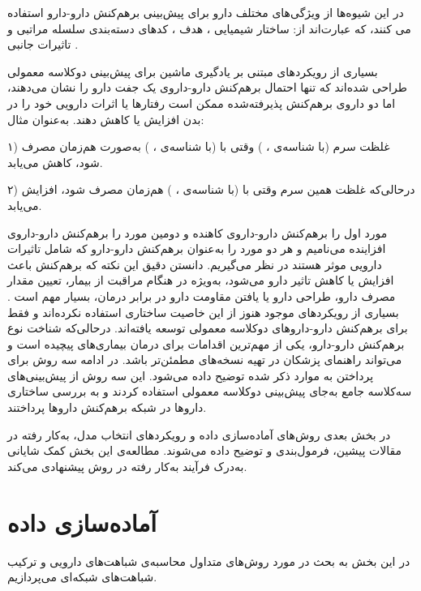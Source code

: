 در این شیوه‌ها از ویژگی‌های مختلف دارو برای پیش‌بینی برهم‌کنش دارو-دارو استفاده می کنند، که عبارت‌اند از: ساختار شیمیایی
\cite{Vilar2014}،
هدف
\cite{luo2014}،
کدهای دسته‌بندی سلسله مراتبی
\cite{Cheng2014}
و تاثیرات جانبی
\cite{Zhang2015, Shi2017}.

بسیاری از رویکردهای مبتنی بر یادگیری ماشین برای پیش‌بینی دوکلاسه معمولی طراحی شده‌اند که تنها احتمال برهم‌کنش دارو-داروی یک جفت دارو را نشان می‌دهند، اما دو داروی برهم‌کنش پذیرفته‌شده ممکن است رفتارها یا اثرات دارویی خود را در بدن افزایش یا کاهش دهند.
به‌عنوان مثال:

۱) غلظت سرم
(با شناسه‌ی
،
)
وقتی با
(با شناسه‌ی
،
)
به‌صورت هم‌زمان مصرف شود، کاهش می‌یابد.

۲) درحالی‌که غلظت همین سرم وقتی با 
(با شناسه‌ی
،
)
هم‌زمان مصرف شود، افزایش می‌یابد.

مورد اول را برهم‌کنش دارو-داروی کاهنده
و دومین مورد را برهم‌کنش دارو-داروی افزاینده
می‌نامیم و هر دو مورد را به‌عنوان برهم‌کنش دارو-دارو که شامل تاثیرات دارویی موثر هستند در نظر می‌گیریم. دانستن دقیق این نکته که برهم‌کنش باعث افزایش یا کاهش تاثیر دارو می‌شود، به‌ویژه در هنگام مراقبت از بیمار، تعیین مقدار مصرف دارو، طراحی دارو یا یافتن مقاومت دارو در برابر درمان، بسیار مهم است
\cite{Koch1981}.
بسیاری از رویکردهای موجود هنوز از این خاصیت ساختاری استفاده نکرده‌اند و فقط برای برهم‌کنش دارو-داروهای دوکلاسه معمولی توسعه یافته‌اند. درحالی‌که شناخت نوع برهم‌کنش دارو-دارو، یکی از مهم‌ترین اقدامات برای درمان بیماری‌های پیچیده است
\cite{Cokol2017}
و می‌تواند راهنمای پزشکان در تهیه نسخه‌های مطمئن‌تر باشد. در ادامه سه روش برای پرداختن به موارد ذکر شده توضیح داده می‌شود. این سه روش از پیش‌بینی‌های سه‌کلاسه جامع به‌جای پیش‌بینی دوکلاسه معمولی استفاده کردند و به بررسی ساختاری داروها در شبکه برهم‌کنش داروها پرداختند.


در بخش بعدی روش‌های آماده‌‌سازی داده و رویکردهای انتخاب مدل، به‌کار رفته در مقالات پیشین، فرمول‌بندی و توضیح داده می‌شوند. مطالعه‌ی این بخش کمک شایانی به‌درک فرآیند به‌کار رفته در روش پیشنهادی می‌کند.


\section{آماده‌سازی داده}
\label{dataPreparing}
 
در این بخش به بحث در مورد روش‌های متداول محاسبه‌ی شباهت‌های دارویی و ترکیب شباهت‌های شبکه‌ای می‌پردازیم.


